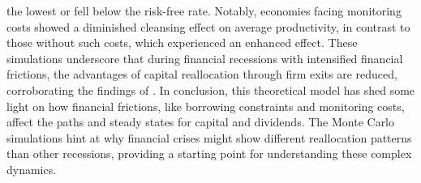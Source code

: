 the lowest or fell below the risk-free rate. Notably, economies facing monitoring costs showed a diminished cleansing
effect on average productivity, in contrast to those without such costs, which experienced an enhanced effect. These
simulations underscore that during financial recessions with intensified financial frictions, the advantages of capital
reallocation through firm exits are reduced, corroborating the findings of \cite{OsePap17}. 
In conclusion, this theoretical model has shed some light on how financial frictions, like borrowing constraints and
monitoring costs, affect the paths and steady states for capital and dividends. The Monte Carlo simulations hint at why
financial crises might show different reallocation patterns than other recessions, providing a starting point for
understanding these complex dynamics.  